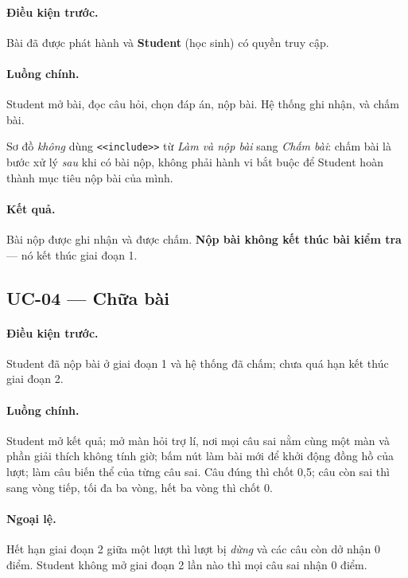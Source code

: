 \paragraph{Điều kiện trước.} Bài đã được phát hành và \textbf{Student} (học sinh) có quyền truy cập.

\paragraph{Luồng chính.} Student mở bài, đọc câu hỏi, chọn đáp án, nộp bài. Hệ thống ghi nhận, và chấm bài.

Sơ đồ \emph{không} dùng \texttt{<<include>>} từ \emph{Làm và nộp bài} sang \emph{Chấm bài}: 
chấm bài là bước xử lý \emph{sau} khi có bài nộp, không phải hành vi bắt buộc để Student hoàn thành mục tiêu nộp bài của mình.

\paragraph{Kết quả.} Bài nộp được ghi nhận và được chấm. \textbf{Nộp bài không kết thúc bài kiểm
tra} --- nó kết thúc giai đoạn 1.

\subsection{UC-04 --- Chữa bài}

\paragraph{Điều kiện trước.} Student đã nộp bài ở giai đoạn 1 và hệ thống đã chấm; chưa quá hạn kết
thúc giai đoạn 2.

\paragraph{Luồng chính.} Student mở kết quả; mở màn hỏi trợ lí, nơi mọi câu sai nằm cùng một màn
và phần giải thích không tính giờ; bấm nút làm bài mới để khởi động đồng hồ của lượt; làm câu biến
thể của từng câu sai. Câu đúng thì chốt 0,5; câu còn sai thì sang vòng tiếp, tối đa ba
vòng, hết ba vòng thì chốt 0.

\paragraph{Ngoại lệ.} Hết hạn giai đoạn 2 giữa một lượt thì lượt bị \emph{dừng} và các câu còn dở nhận
0 điểm. Student không mở giai đoạn 2 lần nào thì mọi câu sai nhận 0 điểm.

